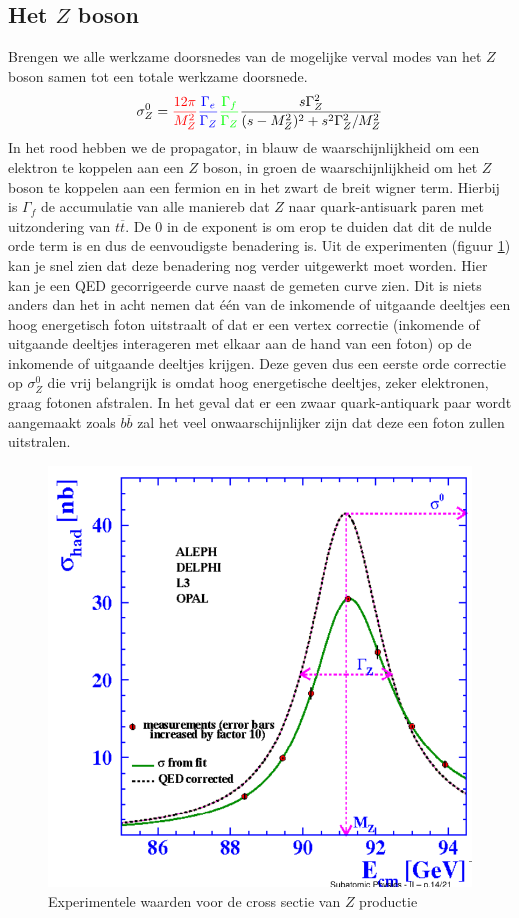 \documentclass[../main.tex]{subfiles}
\begin{document}
\subsection{Het $Z$ boson}%
\label{sub:het_z_boson}

Brengen we alle werkzame doorsnedes van de mogelijke verval modes van het $Z$ boson samen tot een totale werkzame doorsnede.
\begin{equation}
    \begin{aligned}
        \label{eq:z_werkzame_doorsnede}
        \sigma_Z^0 = {\color{red} \frac{12\pi}{M_Z^2}} {\color{blue} \frac{\Gamma_e}{\Gamma_Z}} {\color{green} \frac{\Gamma_f}{\Gamma_Z}} \frac{s\Gamma_Z^2}{(s-M_Z^2)^2 + s^2\Gamma_Z^2/M_Z^2}
    \end{aligned}
\end{equation}
In het rood hebben we de propagator, in blauw de waarschijnlijkheid om een elektron te koppelen aan een $Z$ boson, in groen de waarschijnlijkheid om het $Z$ boson te koppelen aan een fermion en in het zwart de breit wigner term. Hierbij is $\Gamma_f$ de accumulatie van alle maniereb dat $Z$ naar quark-antisuark paren met uitzondering van $t\overline t$. De 0 in de exponent is om erop te duiden dat dit de nulde orde term is en dus de eenvoudigste benadering is. Uit de experimenten (figuur \ref{fig:elektroweak_precision_tests/het_z_boson}) kan je snel zien dat deze benadering nog verder uitgewerkt moet worden. Hier kan je een QED gecorrigeerde curve naast de gemeten curve zien. Dit is niets anders dan het in acht nemen dat één van de inkomende of uitgaande deeltjes een hoog energetisch foton uitstraalt of dat er een vertex correctie (inkomende of uitgaande deeltjes interageren met elkaar aan de hand van een foton) op de inkomende of uitgaande deeltjes krijgen. Deze geven dus een eerste orde correctie op $\sigma_Z^0$ die vrij belangrijk is omdat hoog energetische deeltjes, zeker elektronen, graag fotonen afstralen. In het geval dat er een zwaar quark-antiquark paar wordt aangemaakt zoals $b\overline b$ zal het veel onwaarschijnlijker zijn dat deze een foton zullen uitstralen.

\begin{figure}[h]
    \centering
    \includegraphics[width=0.6\linewidth]{elektroweak_precision_tests/het_z_boson.png}
    \caption{Experimentele waarden voor de cross sectie van $Z$ productie}%
    \label{fig:elektroweak_precision_tests/het_z_boson}
\end{figure}
\end{document}
